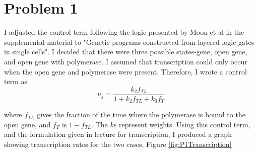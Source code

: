\documentclass{article}
\begin{document}
 
\section*{Problem 1}
I adjusted the control term following the logic presented by Moon et al in the supplemental material to "Genetic programs constructed from layered logic gates in single cells". I decided that there were three possible states-gene, open gene, and open gene with polymerase. I assumed that transcription could only occur when the open gene and polymerase were present. Therefore, I wrote a control term as
\begin{equation}
u_j = \frac{k_2f_{TL}}{1+k_2f_{TL}+k_3f_T}
\end{equation}

where $f_{TL}$ gives the fraction of the time where the polymerase is bound to the open gene, and $f_T$ is $1-f_{TL}$. The $k$s represent weights. Using this control term, and the formulation given in lecture for transcription, I produced a graph showing transcription rates for the two cases, Figure \ref{fig:P1Transcription}
\end{document}
